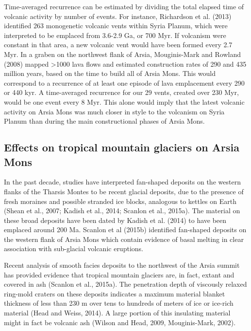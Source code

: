 \documentclass[12pt,letter]{article}
\begin{document}
Time-averaged recurrence can be estimated by dividing the total elapsed time of volcanic activity by number of events. For instance, Richardson et al. (2013) identified 263 monogenetic volcanic vents within Syria Planum, which were interpreted to be emplaced from 3.6-2.9 Ga, or 700 Myr. If volcanism were constant in that area, a new volcanic vent would have been formed every 2.7 Myr. In a graben on the northwest flank of Arsia, Mouginis-Mark and Rowland (2008) mapped >1000 lava flows and estimated construction rates of 290 and 435 million years, based on the time to build all of Arsia Mons. This would correspond to a recurrence of at least one episode of lava emplacement every 290 or 440 kyr. A time-averaged recurrence for our 29 vents, created over 230 Myr, would be one event every 8 Myr. This alone would imply that the latest volcanic activity on Arsia Mons was much closer in style to the volcanism on Syria Planum than during the main constructional phases of Arsia Mons.

\subsection{Effects on tropical mountain glaciers on Arsia Mons}

In the past decade, studies have interpreted fan-shaped deposits on the western flanks of the Tharsis Montes to be recent glacial deposits, due to the presence of fresh moraines and possible stranded ice blocks, analogous to kettles on Earth (Shean et al., 2007; Kadish et al., 2014; Scanlon et al., 2015a). The material on these broad deposits have been dated by Kadish et al. (2014) to have been emplaced around 200 Ma. Scanlon et al (2015b) identified fan-shaped deposits on the western flank of Arsia Mons which contain evidence of basal melting in clear association with sub-glacial volcanic eruptions. 

Recent analysis of smooth facies deposits to the northwest of the Arsia summit has provided evidence that tropical mountain glaciers are, in fact, extant and covered in ash (Scanlon et al., 2015a). The penetration depth of viscously relaxed ring-mold craters on these deposits indicates a maximum material blanket thickness of less than 230 m over tens to hundreds of meters of ice or ice-rich material (Head and Weiss, 2014). A large portion of this insulating material might in fact be volcanic ash (Wilson and Head, 2009, Mouginis-Mark, 2002).
\end{document}
